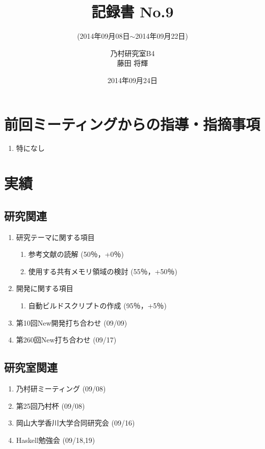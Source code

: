 \documentclass[fleqn, 14pt]{extarticle}
\subtitle{(2014年09月08日$\sim$2014年09月22日)}
\author{乃村研究室B4\\藤田 将輝}
\date{2014年09月24日}
\title{記録書 No.9}
\begin{document}
\maketitle




\section{前回ミーティングからの指導・指摘事項}
\label{sec-1}
\begin{enumerate}
\item 特になし
\newline
\hfill

\end{enumerate}




\section{実績}
\label{sec-2}

\subsection{研究関連}
\label{sec-2-1}
\begin{enumerate}
\item 研究テーマに関する項目
\hfill
\label{enum-research1}
\begin{enumerate}

\item 参考文献の読解
\hfill
\label{enum-1-A}
(50％，+0％)
\item 使用する共有メモリ領域の検討
\hfill
\label{enum-1-B}
(55％，+50％)
\end{enumerate}
\item 開発に関する項目
\hfill
\label{enum-research2}
\begin{enumerate}

\item 自動ビルドスクリプトの作成
\hfill
\label{enum-2-A}
(95％，+5％)
\end{enumerate}

\item 第10回New開発打ち合わせ
\hfill
\label{enum-3}
(09/09)
\item 第260回New打ち合わせ
\hfill
\label{enum-4}
(09/17)



\end{enumerate}

\subsection{研究室関連}
\label{sec-2-2}
\begin{enumerate}
\item 乃村研ミーティング
\hfill
\label{enum-lab1}
(09/08)
\item 第25回乃村杯
\hfill
\label{enum-lab2}
(09/08)
\item 岡山大学香川大学合同研究会
\hfill
\label{enum-lab3}
(09/16)
\item Haskell勉強会
\hfill
\label{enum-lab4}
(09/18,19)
\end{enumerate}
\end{document}
